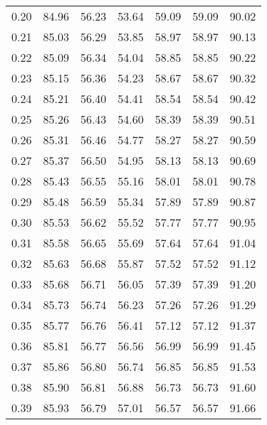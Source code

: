 \begin{tabular}{|c|c|c|c|c|c|c|}
      0.20 &     84.96 &     56.23 &      53.64 &   59.09 &      59.09 &         90.02 \\
      0.21 &     85.03 &     56.29 &      53.85 &   58.97 &      58.97 &         90.13 \\
      0.22 &     85.09 &     56.34 &      54.04 &   58.85 &      58.85 &         90.22 \\
      0.23 &     85.15 &     56.36 &      54.23 &   58.67 &      58.67 &         90.32 \\
      0.24 &     85.21 &     56.40 &      54.41 &   58.54 &      58.54 &         90.42 \\
      0.25 &     85.26 &     56.43 &      54.60 &   58.39 &      58.39 &         90.51 \\
      0.26 &     85.31 &     56.46 &      54.77 &   58.27 &      58.27 &         90.59 \\
      0.27 &     85.37 &     56.50 &      54.95 &   58.13 &      58.13 &         90.69 \\
      0.28 &     85.43 &     56.55 &      55.16 &   58.01 &      58.01 &         90.78 \\
      0.29 &     85.48 &     56.59 &      55.34 &   57.89 &      57.89 &         90.87 \\
      0.30 &     85.53 &     56.62 &      55.52 &   57.77 &      57.77 &         90.95 \\
      0.31 &     85.58 &     56.65 &      55.69 &   57.64 &      57.64 &         91.04 \\
      0.32 &     85.63 &     56.68 &      55.87 &   57.52 &      57.52 &         91.12 \\
      0.33 &     85.68 &     56.71 &      56.05 &   57.39 &      57.39 &         91.20 \\
      0.34 &     85.73 &     56.74 &      56.23 &   57.26 &      57.26 &         91.29 \\
      0.35 &     85.77 &     56.76 &      56.41 &   57.12 &      57.12 &         91.37 \\
      0.36 &     85.81 &     56.77 &      56.56 &   56.99 &      56.99 &         91.45 \\
      0.37 &     85.86 &     56.80 &      56.74 &   56.85 &      56.85 &         91.53 \\
      0.38 &     85.90 &     56.81 &      56.88 &   56.73 &      56.73 &         91.60 \\
      0.39 &     85.93 &     56.79 &      57.01 &   56.57 &      56.57 &         91.66 \\

\end{tabular}
